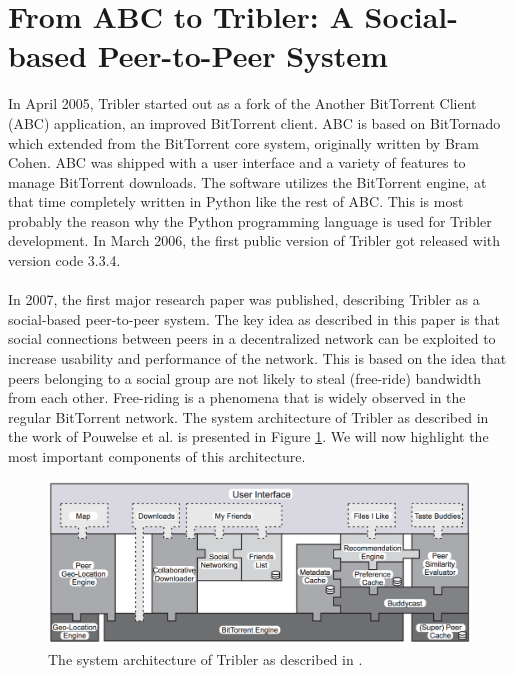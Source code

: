 \section{From ABC to Tribler: A Social-based Peer-to-Peer System}
In April 2005, Tribler started out as a fork of the Another BitTorrent Client (ABC) application, an improved BitTorrent client. ABC is based on BitTornado which extended from the BitTorrent core system, originally written by Bram Cohen. ABC was shipped with a user interface and a variety of features to manage BitTorrent downloads. The software utilizes the BitTorrent engine, at that time completely written in Python like the rest of ABC. This is most probably the reason why the Python programming language is used for Tribler development. In March 2006, the first public version of Tribler got released with version code 3.3.4.\\\\
In 2007, the first major research paper was published, describing Tribler as a social-based peer-to-peer system\cite{pouwelse2008tribler}. The key idea as described in this paper is that social connections between peers in a decentralized network can be exploited to increase usability and performance of the network. This is based on the idea that peers belonging to a social group are not likely to steal (free-ride) bandwidth from each other. Free-riding is a phenomena that is widely observed in the regular BitTorrent network. The system architecture of Tribler as described in the work of Pouwelse et al. is presented in Figure \ref{fig:tribler-architecture-2008}. We will now highlight the most important components of this architecture.

\begin{figure}[t]
	\centering
	\includegraphics[width=1.0\columnwidth]{images/tribler_architecture_2007}
	\caption{The system architecture of Tribler as described in \cite{pouwelse2008tribler}.}
	\label{fig:tribler-architecture-2008}
\end{figure}

